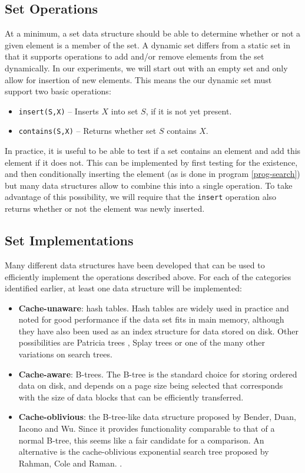 \documentclass{acm_proc_article-sp}
\begin{document}
\subsection{Set Operations}
At a minimum, a set data structure should be able to determine whether or not a given element is a member of the set. A dynamic set differs from a static set in that it supports operations to add and/or remove elements from the set dynamically. In our experiments, we will start out with an empty set and only allow for insertion of new elements. This means the our dynamic set must support two basic operations:
\begin{itemize}
\item \verb#insert(S,X)# -- Inserts $X$ into set $S$, if it is not yet present.
\item \verb#contains(S,X)# -- Returns whether set $S$ contains $X$.
\end{itemize}
In practice, it is useful to be able to test if a set contains an element and add this element if it does not. This can be implemented by first testing for the existence, and then conditionally inserting the element (as is done in program \ref{prog-search}) but many data structures allow to combine this into a single operation. To take advantage of this possibility, we will require that the \verb#insert# operation also returns whether or not the element was newly inserted.

\subsection{Set Implementations}
Many different data structures have been developed that can be used to efficiently implement the operations described above. For each of the categories identified earlier, at least one data structure will be implemented:
\begin{itemize}
\item \textbf{Cache-unaware}: hash tables. Hash tables are widely used in practice and noted for good performance if the data set fits in main memory, although they have also been used as an index structure for data stored on disk. Other possibilities are Patricia trees \cite{morrison1968ppa}, Splay trees \cite{sleator1985sab} or one of the many other variations on search trees.
\item \textbf{Cache-aware}: B-trees. The B-tree is the standard choice for storing ordered data on disk, and depends on a page size being selected that corresponds with the size of data blocks that can be efficiently transferred.
\item \textbf{Cache-oblivious}: the B-tree-like data structure proposed by Bender, Duan, Iacono and Wu. Since it provides functionality comparable to that of a normal B-tree, this seems like a fair candidate for a comparison. An alternative is the cache-oblivious exponential search tree proposed by Rahman, Cole and Raman. \cite{rahman2001opd}.
\end{itemize}
\end{document}
